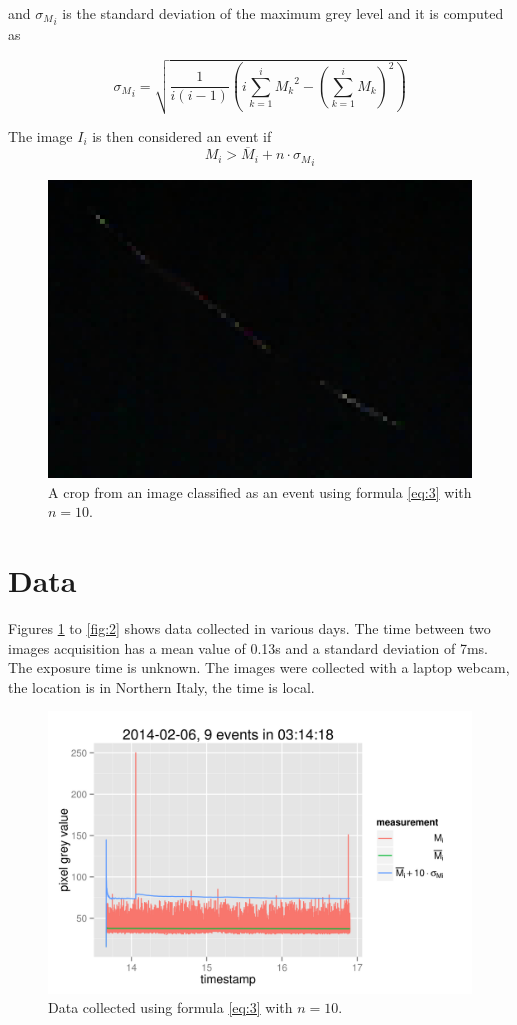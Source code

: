 \documentclass[a4paper,12pt]{article}
\begin{document}
 and ${\sigma_{M}}_{i}$ is the standard deviation of the maximum grey level and it is computed as

 $${\sigma_{M}}_{i}=\sqrt{\frac{1}{i(i-1)}\left(i\sum_{k=1}^i {M_k}^2-\left(\sum_{k=1}^i M_k\right)^2\right)}$$


The image $I_i$ is then considered an event if 
\begin{equation}
M_i>\overline{M}_i+n\cdot{\sigma_{M}}_{i}\label{eq:3}
\end{equation}

\begin{figure}[h!]
  \centering
  \includegraphics[scale=0.5]{bella.png}
  \caption{A crop from an image classified as an event using formula \ref{eq:3} with $n=10$.}
\end{figure}

\section{Data}
Figures \ref{fig:1} to \ref{fig:2} shows data collected in various days.
The time between two images acquisition has a mean value of 0.13s and a standard deviation of 7ms.
The exposure time is unknown.
The images were collected with a laptop webcam, the location is in Northern Italy, the time is local.

\begin{figure}[h!]
  \centering
  \includegraphics{20140206.png}
  \caption{Data collected using formula \ref{eq:3} with $n=10$.}\label{fig:1}
\end{figure}
\end{document}

